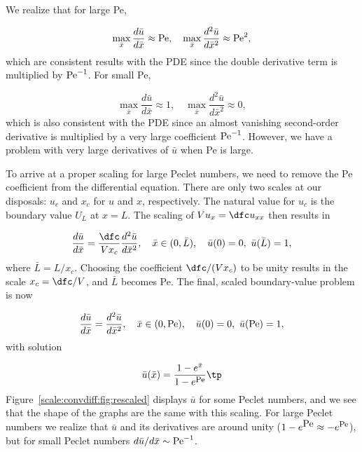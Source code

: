 \documentclass[graybox,envcountchap,sectrefs,final]{svmonodo}
\begin{document}
We realize that for large Pe,

\[ \max_{\bar x}\frac{d\bar u}{d\bar x} \approx \hbox{Pe},\quad
\max_{\bar x}\frac{d^2\bar u}{d\bar x^2} \approx \hbox{Pe}^{2},\]
which are consistent results with the PDE since the double derivative term
is multiplied by $\hbox{Pe}^{-1}$.
For small Pe,

\[ \max_{\bar x}\frac{d\bar u}{d\bar x}     \approx 1,\quad
   \max_{\bar x}\frac{d^2\bar u}{d\bar x^2} \approx 0,\]
which is also consistent with the PDE
since an almost vanishing second-order derivative
is multiplied by a very large coefficient $\hbox{Pe}^{-1}$.
However, we have a problem with very large
derivatives of $\bar u$ when Pe is large.

To arrive at a proper scaling for large Peclet numbers,
we need to remove the Pe coefficient
from the differential equation. There are only two scales at our
disposals: $u_c$ and $x_c$ for $u$ and $x$, respectively.
The natural value for $u_c$ is the boundary value $U_L$ at $x=L$.
The scaling of $Vu_x = \dfc u_{xx}$ then results in

\[ \frac{d\bar u}{d\bar x} = \frac{\dfc}{Vx_c}\frac{d^2\bar u}{d\bar x^2},
\quad \bar x\in (0,\bar L),\quad \bar u(0)=0,\ \bar u(\bar L)=1,\]
where $\bar L = L/x_c$. Choosing the coefficient $\dfc/(Vx_c)$ to
be unity results in the scale $x_c=\dfc/V$, and $\bar L$ becomes Pe.
The final, scaled boundary-value
problem is now

\[ \frac{d\bar u}{d\bar x} = \frac{d^2\bar u}{d\bar x^2},
\quad \bar x \in (0, \hbox{Pe}), \quad \bar u(0)=0,\ \bar u(\hbox{Pe})=1,\]
with solution

\[ \bar u(\bar x) = \frac{1 - e^{\bar x}}{1 - e^{\hbox{\footnotesize Pe}}}\tp\]
Figure~\ref{scale:convdiff:fig:rescaled} displays $\bar u$ for some
Peclet numbers, and we see that the shape of the graphs are the same
with this scaling. For large Peclet numbers we realize that $\bar u$
and its derivatives are around unity
($1-e^{\hbox{Pe}}\approx -e^{\hbox{\footnotesize Pe}}$),
but for small Peclet numbers $d\bar u/d\bar x \sim \hbox{Pe}^{-1}$.
\end{document}
